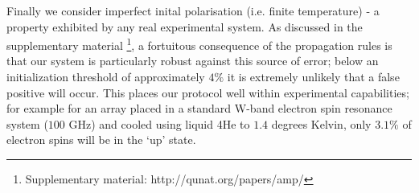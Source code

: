
Finally we consider imperfect inital polarisation (i.e. finite temperature) - a property exhibited by any real experimental system. As discussed in the supplementary material \footnote{Supplementary material: http://qunat.org/papers/amp/}, a fortuitous consequence of the propagation rules is that our system is particularly robust against this source of error; below an initialization threshold of approximately $4\%$ it is extremely unlikely that a false positive will occur. This places our protocol well within experimental capabilities; for example for an array placed in a standard W-band electron spin resonance system ($100$ GHz) and cooled using liquid 4He to $1.4$ degrees Kelvin, only $3.1\%$ of electron spins will be in the `up' state.





